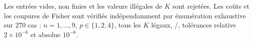 Les entrées vides, non finies et les valeurs illégales de $K$ sont rejetées.
Les coûts et les coupures de Fisher sont vérifiés indépendamment par
énumération exhaustive sur 270 cas :
$n=1,\dots,9$, $p\in\{1,2,4\}$, tous les $K$ légaux,
/, tolérances relative $2\times10^{-6}$ et absolue $10^{-6}$.
